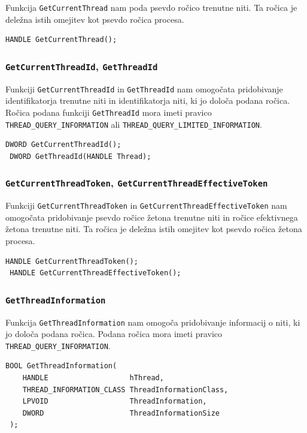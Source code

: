 \documentclass[a4paper,12pt,openright]{book}
\begin{document}
Funkcija \texttt{GetCurrentThread} nam poda psevdo ročico trenutne niti.
Ta ročica je deležna istih omejitev kot psevdo ročica procesa.

\begin{lstlisting}[style=func]
 HANDLE GetCurrentThread();
\end{lstlisting}

\subsubsection{\texttt{GetCurrentThreadId}, \texttt{GetThreadId}}

Funkciji \texttt{GetCurrentThreadId} in \texttt{GetThreadId} nam omogočata pridobivanje identifikatorja trenutne niti in identifikatorja niti, ki jo določa podana ročica.
Ročica podana funkciji \texttt{GetThreadId} mora imeti pravico \texttt{THREAD\_QUERY\_INFORMATION} ali \texttt{THREAD\_QUERY\_LIMITED\_INFORMATION}.

\begin{lstlisting}[style=func]
 DWORD GetCurrentThreadId();
 DWORD GetThreadId(HANDLE Thread);
\end{lstlisting}

\subsubsection{\texttt{GetCurrentThreadToken}, \texttt{GetCurrentThreadEffectiveToken}}

Funkciji \texttt{GetCurrentThreadToken} in \texttt{GetCurrentThreadEffectiveToken} nam omogočata pridobivanje psevdo ročice žetona trenutne niti in ročice efektivnega žetona trenutne niti.
Ta ročica je deležna istih omejitev kot psevdo ročica žetona procesa.

\begin{lstlisting}[style=func]
 HANDLE GetCurrentThreadToken();
 HANDLE GetCurrentThreadEffectiveToken();
\end{lstlisting}

\subsubsection{\texttt{GetThreadInformation}}

Funkcija \texttt{GetThreadInformation} nam omogoča pridobivanje informacij o niti, ki jo določa podana ročica.
Podana ročica mora imeti pravico \texttt{THREAD\_QUERY\_INFORMATION}.

\begin{lstlisting}[style=func]
 BOOL GetThreadInformation(
	HANDLE                   hThread,
	THREAD_INFORMATION_CLASS ThreadInformationClass,
	LPVOID                   ThreadInformation,
	DWORD                    ThreadInformationSize
 );
\end{lstlisting}
\end{document}
